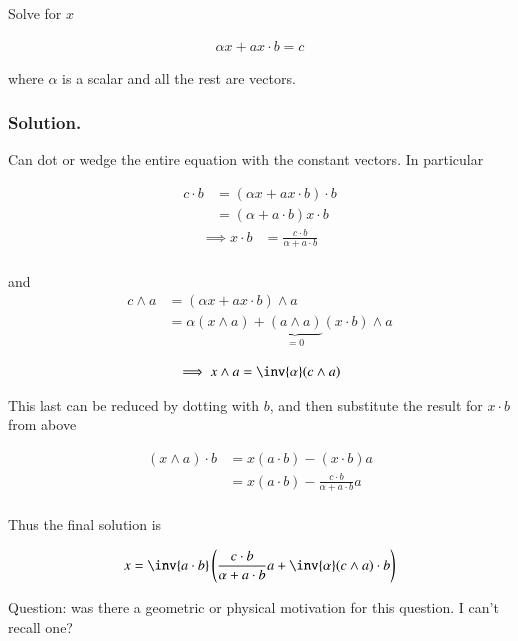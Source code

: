 Solve for $x$

\begin{align*}
\alpha x + a x \cdot b = c
\end{align*}

where $\alpha$ is a scalar and all the rest are vectors.

\subsubsection{Solution. }

Can dot or wedge the entire equation with the constant vectors.  In particular

\begin{align*}
c \cdot b &= (\alpha x + a x \cdot b) \cdot b \\ 
&= (\alpha + a \cdot b) x \cdot b 
\end{align*}
\begin{align*}
\implies
x \cdot b &= \frac{c \cdot b}{\alpha + a \cdot b} \\
\end{align*}

and
\begin{align*}
c \wedge a &= (\alpha x + a x \cdot b) \wedge a \\ 
&= \alpha (x \wedge a) + \underbrace{(a \wedge a)}_{=0} (x \cdot b) \wedge a \\
\end{align*}
\begin{align*}
\implies
x \wedge a &= \inv{\alpha} (c \wedge a) \\
\end{align*}

This last can be reduced by dotting with $b$, and then substitute the 
result for $x \cdot b$ from above

\begin{align*}
(x \wedge a) \cdot b
&= x (a \cdot b) - (x \cdot b) a \\
&= x (a \cdot b) - \frac{c \cdot b}{\alpha + a \cdot b} a \\
\end{align*}

Thus the final solution is

\begin{align*}
x = \inv{a \cdot b}\left(
\frac{c \cdot b}{\alpha + a \cdot b} a 
+ \inv{\alpha} (c \wedge a) \cdot b
\right)
\end{align*}

Question: was there a geometric or physical motivation for this question.  I can't recall one?

